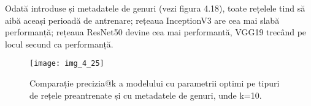Odată introduse și metadatele de genuri (vezi figura 4.18), toate rețelele tind să aibă aceași perioadă de antrenare; rețeaua InceptionV3 are cea mai slabă performanță; rețeaua ResNet50 devine cea mai performantă, VGG19 trecând pe locul secund ca performanță. 
\begin{figure}[!h]
	\centering
	\texttt{[image: img\_4\_25]}
	\caption[Comparație precizia@k a modelului cu parametrii optimi pe tipuri de rețele preantrenate și cu metadatele de genuri]{Comparație precizia@k a modelului cu parametrii optimi pe tipuri de rețele preantrenate și cu metadatele de genuri, unde k=10.}
\end{figure}